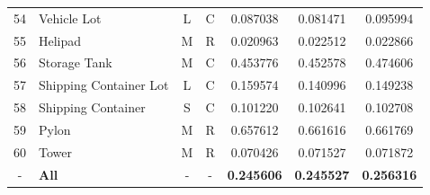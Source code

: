 \begin{center}
\begin{longtable}{|c|l|c|c|c|c|c|}
54 & Vehicle Lot & L & C & 0.087038 & 0.081471 & 0.095994\\
55 & Helipad & M & R & 0.020963 & 0.022512 & 0.022866\\
56 & Storage Tank & M & C & 0.453776 & 0.452578 & 0.474606\\
57 & Shipping Container Lot & L & C & 0.159574 & 0.140996 & 0.149238\\
58 & Shipping Container & S & C & 0.101220 & 0.102641 & 0.102708\\
59 & Pylon & M & R & 0.657612 & 0.661616 & 0.661769\\
60 & Tower & M & R & 0.070426 & 0.071527 & 0.071872\\
- & \textbf{All} & - & - & \textbf{0.245606} & \textbf{0.245527} & \textbf{0.256316}\\
\end{longtable}
\end{center}

